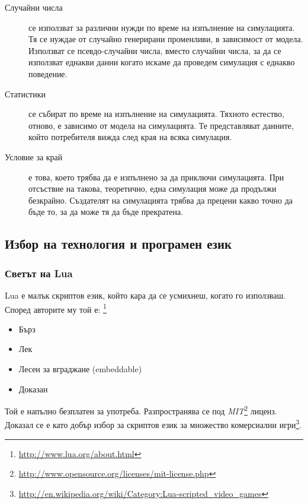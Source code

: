 \begin{description}
				\item[Случайни числа] се използват за различни нужди по време на изпълнение на симулацията.
				Тя се нуждае от случайно генерирани променливи, в зависимост от модела. 
				Използват се псевдо-случайни числа, вместо случайни числа, за да се използват
				еднакви данни когато искаме да проведем симулация с еднакво поведение.				
				
				\item[Статистики] се събират по време на изпълнение на симулацията. Тяхното естество, отново, е зависимо от модела
				на симулацията. Те представляват данните, който потребителя вижда след края на всяка симулация.				
				
				\item[Условие за край] е това, което трябва да е изпълнено за да приключи симулацията. 
				При отсъствие на такова, теоретично, една симулация може да продължи безкрайно.
				Създателят на симулацията трябва да прецени какво точно да бъде то, 
				за да може тя да бъде прекратена.
				
			\end{description}
	
	\subsection{Избор на технология и програмен език}
		\subsubsection{Светът на Lua}
		
			Lua е малък скриптов език, който кара да се усмихнеш, когато го използваш. 
			Според авторите му той е: \footnote{\url{http://www.lua.org/about.html}} 
			
			\begin{itemize}
			
				\item Бърз
				
				\item Лек
				
				\item Лесен за вграджане (embeddable)
				
				\item Доказан
				
			\end{itemize}
			
			Той е напълно безплатен за употреба. Разпространява се под 
			\emph{MIT}\footnote{\url{http://www.opensource.org/licenses/mit-license.php}} лиценз. 
			Доказал се е като добър избор за скриптов език за множество комерсиални 
			игри\footnote{\url{http://en.wikipedia.org/wiki/Category:Lua-scripted_video_games}}.
			
